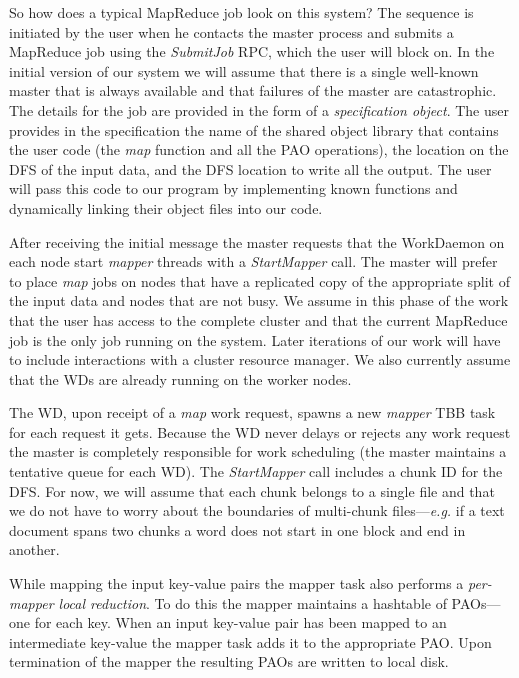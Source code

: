 \documentclass[10pt,letter,final,article,twocolumn]{article} %
\newcommand{\rpc}[1]{\emph{#1}}
\begin{document}
So how does a typical MapReduce job look on this system? The sequence is initiated by the user when he contacts the master process and submits a MapReduce job using the \rpc{SubmitJob} RPC, which the user will block on.  In the initial version of our system we will assume that there is a single well-known master that is always available and that failures of the master are catastrophic. The details for the job are provided in the form of a \emph{specification object}. The user provides in the specification the name of the shared object library that contains the user code (the \emph{map} function and all the PAO operations), the location on the DFS of the input data, and the DFS location to write all the output. The user will pass this code to our program by implementing known functions and dynamically linking their object files into our code.

After receiving the initial message the master requests that the WorkDaemon on each node start \emph{mapper} threads with a \rpc{StartMapper} call. The master will prefer to place \emph{map} jobs on nodes that have a replicated copy of the appropriate split of the input data and nodes that are not busy.  We assume in this phase of the work that the user has access to the complete cluster and that the current MapReduce job is the only job running on the system. Later iterations of our work will have to include interactions with a cluster resource manager. We also currently assume that the WDs are already running on the worker nodes.

The WD, upon receipt of a \emph{map} work request, spawns a new \emph{mapper} TBB task for each request it gets. Because the WD never delays or rejects any work request the master is completely responsible for work scheduling (the master maintains a tentative queue for each WD). The \rpc{StartMapper} call includes a chunk ID for the DFS. For now, we will assume that each chunk belongs to a single file and that we do not have to worry about the boundaries of multi-chunk files---\textit{e.g.} if a text document spans two chunks a word does not start in one block and end in another.

While mapping the input key-value pairs the mapper task also performs a  \emph{per-mapper local reduction}. To do this the mapper maintains a hashtable of PAOs---one for each key. When an input key-value pair has been mapped to an intermediate key-value the mapper task adds it to the appropriate PAO. Upon termination of the mapper the resulting PAOs are written to local disk. 
\end{document}
